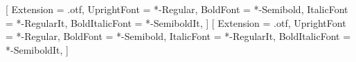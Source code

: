 

\usepackage{fontspec}
\setmainfont{SourceSans3}[
  Extension      = .otf,
  UprightFont    = *-Regular,
  BoldFont       = *-Semibold,
  ItalicFont     = *-RegularIt,
  BoldItalicFont = *-SemiboldIt,
]
\setsansfont{SourceSans3}[
  Extension      = .otf,
  UprightFont    = *-Regular,
  BoldFont       = *-Semibold,
  ItalicFont     = *-RegularIt,
  BoldItalicFont = *-SemiboldIt,
]

\linespread{1.04}


\usepackage[table]{xcolor}



